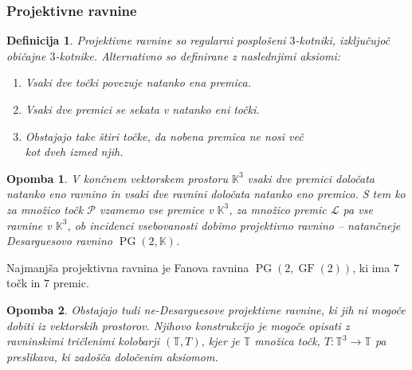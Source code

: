 \documentclass{beamer}
\newtheorem{definicija}[izrek]{Definicija}
\newtheorem{opomba}{Opomba}
\newcommand{\PG}{\operatorname{PG}}
\newcommand{\GF}{\operatorname{GF}}
\newcommand{\PP}{\mathcal{P}}
\newcommand{\LL}{\mathcal{L}}
\newcommand{\fig}[2]{%
  \begin{figure}
    \centering
    \resizebox{#1}{!}{{#2}}
  \end{figure}
}
\begin{document}
\begin{frame}
    \frametitle{Projektivne ravnine}
    \begin{definicija}
        Projektivne ravnine so regularni posplošeni $3$-kotniki, izključujoč običajne $3$-kotnike. 
        Alternativno so definirane z naslednjimi aksiomi:
        \begin{enumerate}[label=(\roman*), noitemsep, topsep=1pt]
            \footnotesize
            \item Vsaki dve točki povezuje natanko ena premica.
            \item Vsaki dve premici se sekata v natanko eni točki.
            \item Obstajajo take štiri točke, da nobena premica ne nosi več\\ kot dveh izmed njih.
        \end{enumerate}
    \end{definicija}
    \begin{opomba}
        V končnem vektorskem prostoru $\mathbb{K}^3$ vsaki dve premici določata natanko 
        eno ravnino in vsaki dve ravnini določata natanko eno premico. S tem ko 
        za množico točk $\PP$ vzamemo vse premice v $\mathbb{K}^3$, za množico premic 
        $\LL$ pa vse ravnine v $\mathbb{K}^3$, ob incidenci vsebovanosti dobimo projektivno ravnino
        -- natančneje Desarguesovo ravnino $\PG(2, \mathbb{K})$.
    \end{opomba}
\end{frame}

\begin{frame}
    \fig{0.75\textwidth}{fano-pg2.tex}
    \begin{center}
        \small Najmanjša projektivna ravnina je Fanova ravnina $\PG(2, \GF(2))$, 
        ki ima $7$ točk in $7$ premic.
    \end{center}
    \begin{opomba}
        Obstajajo tudi ne-Desarguesove projektivne ravnine, ki jih ni mogoče dobiti iz 
        vektorskih prostorov. Njihovo konstrukcijo je mogoče opisati z
        \emph{ravninskimi tričlenimi kolobarji} $(\mathbb{T}, T)$, kjer je $\mathbb{T}$ 
        množica točk, $T: \mathbb{T}^3 \to \mathbb{T}$ pa preslikava, ki zadošča določenim
        aksiomom. 
    \end{opomba}
\end{frame}
\end{document}
